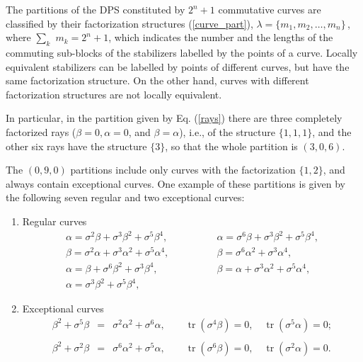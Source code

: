 \documentclass[quantumrep,article,submit,pdftex,moreauthors]{Definitions/mdpi}
\DeclareMathOperator{\tr}{tr}
\begin{document}
The partitions of the DPS constituted by $2^{n}+1$ commutative curves are
classified by their factorization structures (\ref{curve_part}), $\lambda
=\{m_{1},m_{2},\ldots ,m_{n}\}\,$, where $\sum_{k}$ $m_{k}=2^{n}+1$, which
indicates the number and the lengths of the commuting sub-blocks of the
stabilizers labelled by the points of a curve. Locally equivalent stabilizers
can be labelled by points of different curves, but  have the same factorization
structure. On the other hand, curves with different factorization structures are
not locally equivalent.

In particular, in the partition given by Eq. (\ref{rays}) there are three
completely factorized rays ($\beta = 0, \alpha = 0$, and $\beta = \alpha$),
i.e., of the structure $\{1,1,1\}$, and the other six rays have the structure
$\{3\}$, so that the whole partition is $(3,0,6)$.

The $(0,9,0)$ partitions include only curves with the factorization $\{1,2\}$,
and always contain exceptional curves. One example of these partitions is given
by the following seven regular and two exceptional curves:

\begin{enumerate}[label = \alph*)]
	\item Regular curves
	\begin{equation}
	  \begin{array}{ll}
		\alpha = \sigma^{2}\beta + \sigma^{3}\beta^{2} + \sigma^{5}\beta^{4},
		\qquad\qquad
		& \alpha = \sigma^{6}\beta + \sigma^{3}\beta^{2} +
		\sigma^{5}\beta^{4},\\[5pt]
		\beta = \sigma^{2}\alpha + \sigma^{3}\alpha^{2} + \sigma^{5}\alpha^{4},
		\qquad\qquad
		& \beta = \sigma^{6}\alpha^{2} + \sigma^{3}\alpha^{4}, \\[5pt]
		\alpha = \beta + \sigma^{6}\beta^{2} + \sigma^{3}\beta^{4},
		\qquad\qquad
		& \beta = \alpha + \sigma^{3}\alpha^{2} + \sigma^{5}\alpha^{4}, \\[5pt]
		\alpha = \sigma^{3}\beta^{2} + \sigma^{5}\beta^{4},
		\qquad\qquad
		&
	  \end{array}
	\end{equation}

	\item Exceptional curves
	\begin{eqnarray}
	  \beta^{2} + \sigma^{5}\beta
	  &=& \sigma^{2}\alpha^{2} + \sigma^{6}\alpha,
	  \qquad
	  \tr(\sigma^{4}\beta)=0,
	  \quad
	  \tr(\sigma^{5}\alpha)=0;
	  \nonumber \\
	  && \\
	  \beta^{2} + \sigma^{2}\beta
	  &=& \sigma^{6}\alpha^{2} + \sigma^{5}\alpha,
	  \qquad
	  \tr(\sigma^{6}\beta)=0,
	  \quad
	  \tr(\sigma^{2}\alpha)=0.
	  \nonumber
	\end{eqnarray}
\end{enumerate}
\end{document}
